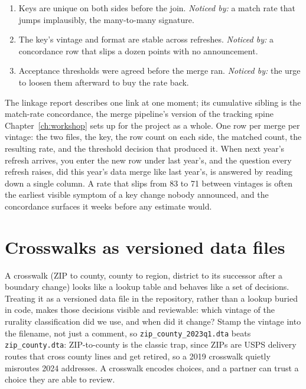 \documentclass[
    a4paper,
    fontsize=10pt,
    twoside=true,
    numbers=noenddot,
]{kaobook}
\newenvironment{restson}[1][What this depends on]{%
    \begin{restsonbox}[frametitle={#1}]%
}{%
    \end{restsonbox}%
}
\begin{document}
\begin{restson}[What a trusted merge depends on]
\begin{enumerate}
\item Keys are unique on both sides before the join. \emph{Noticed by:} a match rate that jumps implausibly, the many-to-many signature.
\item The key's vintage and format are stable across refreshes. \emph{Noticed by:} a concordance row that slips a dozen points with no announcement.
\item Acceptance thresholds were agreed before the merge ran. \emph{Noticed by:} the urge to loosen them afterward to buy the rate back.
\end{enumerate}
\end{restson}

The linkage report describes one link at one moment; its cumulative sibling is the match-rate concordance, the merge pipeline's version of the tracking spine Chapter~\ref{ch:workshop} sets up for the project as a whole. One row per merge per vintage: the two files, the key, the row count on each side, the matched count, the resulting rate, and the threshold decision that produced it. When next year's refresh arrives, you enter the new row under last year's, and the question every refresh raises, did this year's data merge like last year's, is answered by reading down a single column. A rate that slips from 83 to 71 between vintages is often the earliest visible symptom of a key change nobody announced, and the concordance surfaces it weeks before any estimate would.

\section{Crosswalks as versioned data files}
A crosswalk (ZIP to county, county to region, district to its successor after a boundary change) looks like a lookup table and behaves like a set of decisions. Treating it as a versioned data file in the repository, rather than a lookup buried in code, makes those decisions visible and reviewable: which vintage of the rurality classification did we use, and when did it change? Stamp the vintage into the filename, not just a comment, so \texttt{zip\_county\_2023q1.dta} beats \texttt{zip\_county.dta}: ZIP-to-county is the classic trap, since ZIPs are USPS delivery routes that cross county lines and get retired, so a 2019 crosswalk quietly misroutes 2024 addresses. A crosswalk encodes choices, and a partner can trust a choice they are able to review.
\end{document}
